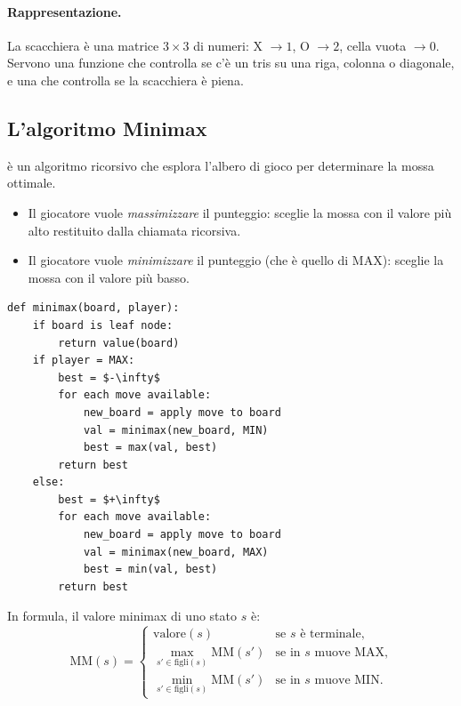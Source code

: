 \paragraph{Rappresentazione.}
La scacchiera è una matrice $3\times 3$ di numeri: X $\to 1$, O $\to 2$, cella vuota $\to 0$.
Servono una funzione che controlla se c'è un tris su una riga, colonna o diagonale, e una che
controlla se la scacchiera è piena.

\subsection{L'algoritmo Minimax}

 è un algoritmo ricorsivo che esplora l'albero di gioco per determinare
la mossa ottimale.
\begin{itemize}
  \item Il giocatore  vuole \emph{massimizzare} il punteggio: sceglie la mossa con il
        valore più alto restituito dalla chiamata ricorsiva.
  \item Il giocatore  vuole \emph{minimizzare} il punteggio (che è quello di MAX):
        sceglie la mossa con il valore più basso.
\end{itemize}

\begin{lstlisting}[style=pseudo]
def minimax(board, player):
    if board is leaf node:
        return value(board)
    if player = MAX:
        best = $-\infty$
        for each move available:
            new_board = apply move to board
            val = minimax(new_board, MIN)
            best = max(val, best)
        return best
    else:
        best = $+\infty$
        for each move available:
            new_board = apply move to board
            val = minimax(new_board, MAX)
            best = min(val, best)
        return best
\end{lstlisting}

In formula, il valore minimax di uno stato $s$ è:
\[
  \text{MM}(s) =
  \begin{cases}
    \text{valore}(s) & \text{se $s$ è terminale,}\\
    \max_{s' \in \text{figli}(s)} \text{MM}(s') & \text{se in $s$ muove MAX,}\\
    \min_{s' \in \text{figli}(s)} \text{MM}(s') & \text{se in $s$ muove MIN.}
  \end{cases}
\]

